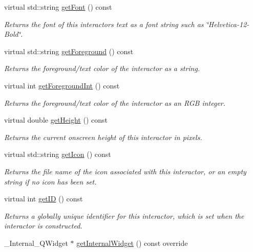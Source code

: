\begin{DoxyCompactItemize}
virtual std\+::string \mbox{\hyperlink{classGInteractor_a894a5502900794eeb27d084c21f1d77d}{get\+Font}} () const
\begin{DoxyCompactList}\small\item\em Returns the font of this interactor\textquotesingle{}s text as a font string such as \char`\"{}\+Helvetica-\/12-\/\+Bold\char`\"{}. \end{DoxyCompactList}\item 
virtual std\+::string \mbox{\hyperlink{classGInteractor_a4fa2d8b0192a3a5b4af4bbfe71194d03}{get\+Foreground}} () const
\begin{DoxyCompactList}\small\item\em Returns the foreground/text color of the interactor as a string. \end{DoxyCompactList}\item 
virtual int \mbox{\hyperlink{classGInteractor_ac3b12ab385a6ef9ae90fc879860ba726}{get\+Foreground\+Int}} () const
\begin{DoxyCompactList}\small\item\em Returns the foreground/text color of the interactor as an R\+GB integer. \end{DoxyCompactList}\item 
virtual double \mbox{\hyperlink{classGInteractor_a1e7e353362434072875264cf95629f99}{get\+Height}} () const
\begin{DoxyCompactList}\small\item\em Returns the current onscreen height of this interactor in pixels. \end{DoxyCompactList}\item 
virtual std\+::string \mbox{\hyperlink{classGInteractor_aaed62a73004939a64da6f0eb9eb64d73}{get\+Icon}} () const
\begin{DoxyCompactList}\small\item\em Returns the file name of the icon associated with this interactor, or an empty string if no icon has been set. \end{DoxyCompactList}\item 
virtual int \mbox{\hyperlink{classGInteractor_a9c9659a6c6ba66b4107ba59c95a24241}{get\+ID}} () const
\begin{DoxyCompactList}\small\item\em Returns a globally unique identifier for this interactor, which is set when the interactor is constructed. \end{DoxyCompactList}\item 
\+\_\+\+Internal\+\_\+\+Q\+Widget $\ast$ \mbox{\hyperlink{classGCheckBox_a2f6b36b2517087dc90a366b5ce1f5323}{get\+Internal\+Widget}} () const override

\end{DoxyCompactItemize}
